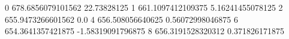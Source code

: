 0 678.6856079101562 22.73828125
1 661.1097412109375 5.16241455078125
2 655.9473266601562 0.0
4 656.508056640625 0.56072998046875
6 654.3641357421875 -1.58319091796875
8 656.3191528320312 0.371826171875
